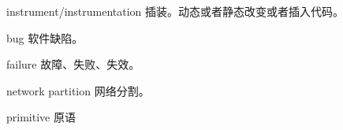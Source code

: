 \begin{denotation}

\item[instrument/instrumentation] 插装。动态或者静态改变或者插入代码。
\item[bug] 软件缺陷。
\item[failure] 故障、失败、失效。
\item[network partition] 网络分割。
\item[primitive] 原语

\end{denotation}
